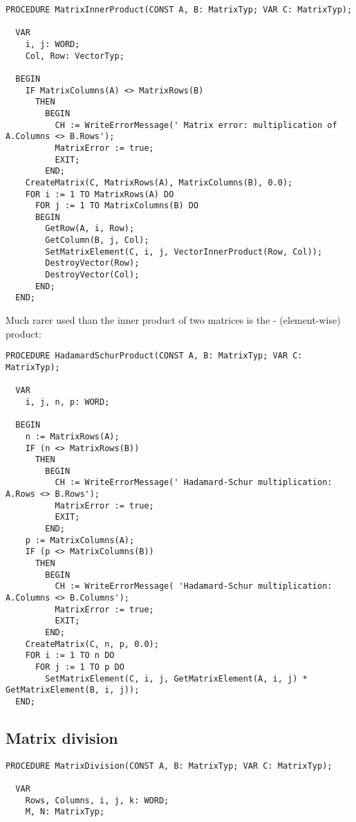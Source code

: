 \begin{refsection}
\begin{lstlisting}[caption=inner product of two matrices]
  PROCEDURE MatrixInnerProduct(CONST A, B: MatrixTyp; VAR C: MatrixTyp);

  VAR
    i, j: WORD;
    Col, Row: VectorTyp;

  BEGIN
    IF MatrixColumns(A) <> MatrixRows(B)
      THEN
        BEGIN
          CH := WriteErrorMessage(' Matrix error: multiplication of A.Columns <> B.Rows');
          MatrixError := true;
          EXIT;
        END;
    CreateMatrix(C, MatrixRows(A), MatrixColumns(B), 0.0);
    FOR i := 1 TO MatrixRows(A) DO
      FOR j := 1 TO MatrixColumns(B) DO
      BEGIN
        GetRow(A, i, Row);
        GetColumn(B, j, Col);
        SetMatrixElement(C, i, j, VectorInnerProduct(Row, Col));
        DestroyVector(Row);
        DestroyVector(Col);
      END;
  END;
\end{lstlisting}

Much rarer used than the inner product of two matrices is the - (element-wise) product:

\begin{lstlisting}[caption=Hadamard-Schur product of two matrices]
  PROCEDURE HadamardSchurProduct(CONST A, B: MatrixTyp; VAR C: MatrixTyp);

  VAR
    i, j, n, p: WORD;

  BEGIN
    n := MatrixRows(A);
    IF (n <> MatrixRows(B))
      THEN
        BEGIN
          CH := WriteErrorMessage(' Hadamard-Schur multiplication: A.Rows <> B.Rows');
          MatrixError := true;
          EXIT;
        END;
    p := MatrixColumns(A);
    IF (p <> MatrixColumns(B))
      THEN
        BEGIN
          CH := WriteErrorMessage( 'Hadamard-Schur multiplication: A.Columns <> B.Columns');
          MatrixError := true;
          EXIT;
        END;
    CreateMatrix(C, n, p, 0.0);
    FOR i := 1 TO n DO
      FOR j := 1 TO p DO
        SetMatrixElement(C, i, j, GetMatrixElement(A, i, j) * GetMatrixElement(B, i, j));
  END;
\end{lstlisting}

\subsection{Matrix division}

\begin{lstlisting}[caption=division of two matrices]
  PROCEDURE MatrixDivision(CONST A, B: MatrixTyp; VAR C: MatrixTyp);

  VAR
    Rows, Columns, i, j, k: WORD;
    M, N: MatrixTyp;


\end{lstlisting}
\end{refsection}
